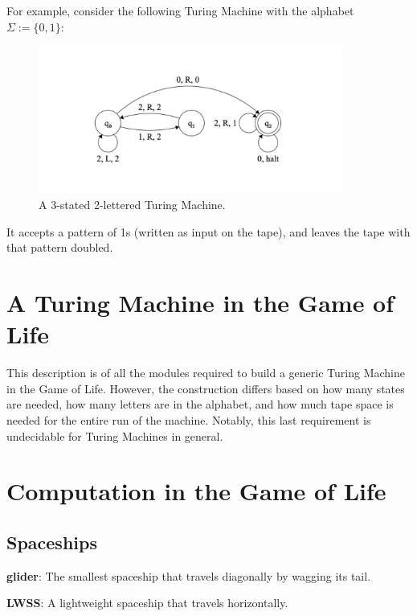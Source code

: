 \documentclass{article}
\begin{document}
For example, consider the following Turing Machine with the alphabet $  \Sigma := \{ 0, 1 \}  $:



\begin{figure}[h]
\centering
\includegraphics[width=10cm,keepaspectratio]{images/TM-example.png}
\captionsetup{labelformat=empty} \caption{A 3-stated 2-lettered Turing Machine.}
\end{figure}



It accepts a pattern of 1s (written as input on the tape), and leaves the tape with that pattern doubled. 


\section{A Turing Machine in the Game of Life}

This description is of all the modules required to build a generic Turing Machine in the Game of Life. However, the construction differs based on how many states are needed, how many letters are in the alphabet, and how much tape space is needed for the entire run of the machine. Notably, this last requirement is undecidable for Turing Machines in general.

\section{Computation in the Game of Life}\subsection{Spaceships}
\noindent\textbf{glider}: The smallest spaceship that travels diagonally by wagging its tail.

\vspace{1em}

\noindent\textbf{LWSS}: A lightweight spaceship that travels horizontally.

\vspace{1em}
\end{document}
